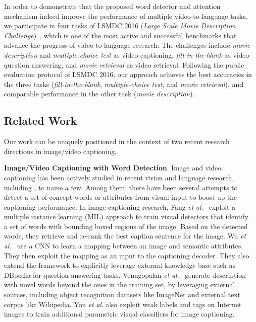 \documentclass[10pt,twocolumn,letterpaper]{article}
\makeatletter
\theoremstyle{nonumberplain}
\DeclareRobustCommand\onedot{\futurelet\@let@token\@onedot}
\def\onedot{.\@\xspace}
\def\etal{\emph{et al}\onedot}
\makeatother
\begin{document}
In order to demonstrate that the proposed word detector and attention mechanism indeed improve the performance of multiple video-to-language tasks,
we participate in four tasks of LSMDC 2016 (\textit{Large Scale Movie Description Challenge})~\cite{rohrbach-ijcv-2017},
which is  one of the most active and successful benchmarks that advance the progress of video-to-language research.
The challenges include \textit{movie description} and \textit{multiple-choice test} as video captioning, \textit{fill-in-the-blank} as video question answering,
and \textit{movie retrieval} as video retrieval.
Following the public evaluation protocol of LSMDC 2016, our approach achieves the best accuracies in the three tasks  (\textit{fill-in-the-blank}, \textit{multiple-choice test}, and \textit{movie retrieval}),
and comparable performance in the other task (\textit{movie description}). 



\subsection{Related Work}
\label{sec:related_work}

Our work can be uniquely positioned in the context of two recent research directions in image/video captioning. 

\textbf{Image/Video Captioning with Word Detection}.
Image and video captioning has been actively studied in recent vision and language research, including \cite{das-cvpr-2013,jeff-cvpr-2015,guadarrama-iccv-2013,rohrbach-gcpr-2015,rohrbach-iccv-2013,venugopalan-iccv-2015,venugopalan-hlt-2015}, to name a few.
Among them, there have been several attempts to detect a set of concept words or attributes from visual input to boost up the captioning performance.
In image captioning research,
Fang \etal~\cite{fang-cvpr-2015} exploit a multiple instance learning (MIL) approach to train visual detectors that identify a set of words with bounding boxed regions of the image.
Based on the detected words, they retrieve and re-rank the best caption sentence for the image.
Wu \etal~\cite{Wu:2016:External} use a CNN to learn a mapping between an image and semantic attributes.
They then exploit the mapping as an input to the captioning decoder.
They also extend the framework to explicitly leverage external knowledge base such as DBpedia for question answering tasks.
Venugopalan \etal~\cite{Venugopalan:2016:NOC} generate description with novel words beyond the ones in the training set,
by leveraging external sources, including object recognition datasets like ImageNet and external text corpus like Wikipedia.
You \etal\cite{quanzeng-cvpr-2016} also exploit weak labels and tags on Internet images to train additional parametric visual classifiers for image captioning.
\end{document}
